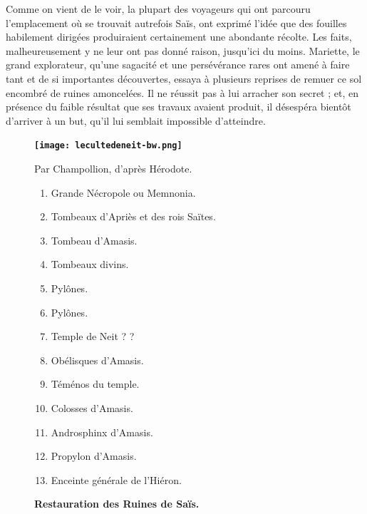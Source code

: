 \documentclass[a4paper, 11pt, oneside]{article}
\begin{document}
Comme on vient de le voir, la plupart des voyageurs qui ont parcouru l'emplacement où se trouvait autrefois Saïs, ont exprimé l'idée que des fouilles habilement dirigées produiraient certainement une abondante récolte. Les faits, malheureusement y ne leur ont pas donné raison, jusqu'ici du moins. Mariette, le grand explorateur, qu'une sagacité et une persévérance rares ont amené à faire tant et de si importantes découvertes, essaya à plusieurs reprises de remuer ce sol encombré de ruines amoncelées. Il ne réussit pas à lui arracher son secret ; et, en présence du faible résultat que ses travaux avaient produit, il désespéra bientôt d'arriver à un but, qu'il lui semblait impossible d'atteindre.
\begin{figure}[H]
\centering\bfseries
\texttt{[image: lecultedeneit-bw.png]}
\caption{\bfseries\textbf{Restauration des Ruines de Saïs.}}
Par Champollion, d'après Hérodote.
\footnotesize
\begin{enumerate}
    \item Grande Nécropole ou Memnonia.
    \item Tombeaux d'Apriès et des rois Saïtes.
    \item Tombeau d'Amasis.
    \item Tombeaux divins.
    \item Pylônes.
    \item Pylônes.
    \item Temple de Neit ? ?
    \item Obélisques d'Amasis.
    \item Téménos du temple.
    \item Colosses d'Amasis.
    \item Androsphinx d'Amasis.
    \item Propylon d'Amasis.
    \item Enceinte générale de l'Hiéron.
\end{enumerate}
\end{figure}
\end{document}
